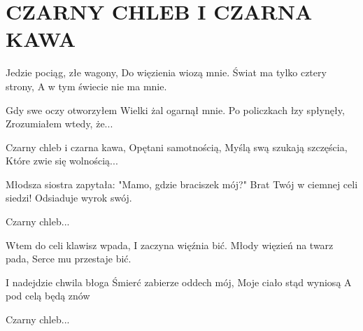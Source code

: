 \documentclass[../../../songbook.tex]{subfiles}
\begin{document}
\TabPositions{8cm} %
\section*{CZARNY CHLEB I CZARNA KAWA}
{}
\vspace{0.5cm}
Jedzie pociąg, złe wagony,		 \newline	
Do więzienia wiozą mnie.		 \newline	
Świat ma tylko cztery strony,	 \newline	
A w tym świecie nie ma mnie.	 \newline	

Gdy swe oczy otworzyłem \newline
Wielki żal ogarnął mnie. \newline
Po policzkach łzy spłynęły, \newline
Zrozumiałem wtedy, że... \newline

\-\hspace{1cm} Czarny chleb i czarna kawa,	 \newline
\-\hspace{1cm} Opętani samotnością,		 \newline
\-\hspace{1cm} Myślą swą szukają szczęścia,	 \newline
\-\hspace{1cm} Które zwie się wolnością... 		 \newline

Młodsza siostra zapytała: \newline
"Mamo, gdzie braciszek mój?" \newline
Brat Twój w ciemnej celi siedzi! \newline
Odsiaduje wyrok swój. \newline

\-\hspace{1cm} Czarny chleb... \newline

Wtem do celi klawisz wpada, \newline
I zaczyna więźnia bić. \newline
Młody więzień na twarz pada, \newline
Serce mu przestaje bić. \newline

I nadejdzie chwila błoga \newline
Śmierć zabierze oddech mój, \newline
Moje ciało stąd wyniosą \newline
A pod celą będą znów \newline

\-\hspace{1cm} Czarny chleb... \newline
\end{document}
